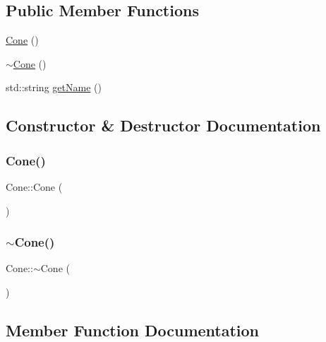 \subsection*{Public Member Functions}
\begin{DoxyCompactItemize}
\item 
\mbox{\hyperlink{class_cone_aec709e915b3271a750d420b14b215bfb}{Cone}} ()
\item 
\mbox{\hyperlink{class_cone_a36a6a946043f7b24a34e42cb88b5a4e8}{$\sim$\+Cone}} ()
\item 
std\+::string \mbox{\hyperlink{class_cone_a9581010134e3d1fe079fe5cce1933786}{get\+Name}} ()
\end{DoxyCompactItemize}


\subsection{Constructor \& Destructor Documentation}
\mbox{\label{class_cone_aec709e915b3271a750d420b14b215bfb}} 
\subsubsection{\texorpdfstring{Cone()}{Cone()}}
{\footnotesize\ttfamily Cone\+::\+Cone (\begin{DoxyParamCaption}{ }\end{DoxyParamCaption})}

\mbox{\label{class_cone_a36a6a946043f7b24a34e42cb88b5a4e8}} 
\subsubsection{\texorpdfstring{$\sim$Cone()}{~Cone()}}
{\footnotesize\ttfamily Cone\+::$\sim$\+Cone (\begin{DoxyParamCaption}{ }\end{DoxyParamCaption})}



\subsection{Member Function Documentation}
\mbox{\label{class_cone_a9581010134e3d1fe079fe5cce1933786}} 
